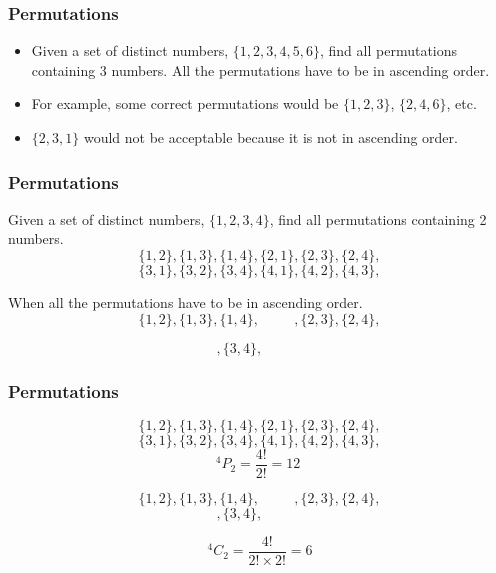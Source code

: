 \documentclass{beamer}
\begin{document}
\begin{frame}
\frametitle{ Permutations }
\large
\begin{itemize}
\item Given a set of distinct numbers, $\{1, 2, 3, 4, 5, 6\}$, find all permutations containing 3 numbers. All the permutations have to be in ascending order.

\item For example, some correct permutations would be $\{1, 2, 3\}$, $\{2, 4, 6\}$, etc. 
\item $\{2, 3, 1\}$ would not be acceptable because it is not in ascending order.
\end{itemize}
\end{frame}
\begin{frame}
\frametitle{ Permutations}

\large
Given a set of distinct numbers, $\{1, 2, 3, 4 \}$, find all permutations containing 2 numbers. 
 \[\{1,2\},\{1,3\},\{1,4\}, \{2,1\}, \{2,3\}, \{2,4\}, \]
 \[\{3,1\},\{3,2\},\{3,4\}, \{4,1\}, \{4,2\}, \{4,3\}, \]
\bigskip

When all the permutations have to be in ascending order.
 \[\{1,2\},\{1,3\},\{1,4\}, \phantom{\{2,1\}}, \{2,3\}, \{2,4\}, \]
 

 \[\phantom{\{3,1\},\{3,2\}},\{3,4\}, \phantom{\{4,1\}, \{4,2\}, \{4,3\}}\]

\end{frame}

%
\begin{frame}
\frametitle{ Permutations}
\[\{1,2\},\{1,3\},\{1,4\}, \{2,1\}, \{2,3\}, \{2,4\}, \]
\[\{3,1\},\{3,2\},\{3,4\}, \{4,1\}, \{4,2\}, \{4,3\}, \]
\[ ^4P_2 = \frac{4!}{2!} = 12 \; \]
\bigskip

\[\{1,2\},\{1,3\},\{1,4\}, \phantom{\{2,1\}}, \{2,3\}, \{2,4\}, \]
\[\phantom{\{3,1\},\{3,2\}},\{3,4\}, \phantom{\{4,1\}, \{4,2\}, \{4,3\}}\]

\[ ^4C_2 = \frac{4!}{2!\times 2!} = 6 \]
\end{frame}
\end{document}
